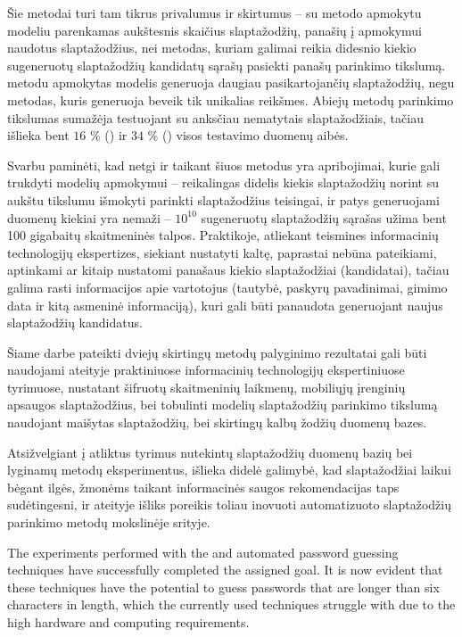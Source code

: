 \documentclass{VUMIFInfBakalaurinis}
\begin{document}
Šie metodai turi tam tikrus privalumus ir skirtumus -- su  
metodo apmokytu modeliu parenkamas aukštesnis skaičius slaptažodžių, panašių į 
apmokymui naudotus slaptažodžius, nei  metodas, kuriam 
galimai reikia didesnio kiekio sugeneruotų slaptažodžių kandidatų sąrašų 
pasiekti panašų parinkimo tikslumą.  metodu apmokytas modelis 
generuoja daugiau pasikartojančių slaptažodžių, negu  metodas, 
kuris generuoja beveik tik unikalias reikšmes. Abiejų metodų parinkimo tikslumas 
sumažėja testuojant su anksčiau nematytais slaptažodžiais, tačiau išlieka bent 
$16$ \% () ir $34$ \% () visos testavimo 
duomenų aibės.

Svarbu paminėti, kad netgi ir taikant šiuos metodus yra apribojimai, kurie gali 
trukdyti modelių apmokymui -- reikalingas didelis kiekis slaptažodžių norint su 
aukštu tikslumu išmokyti parinkti slaptažodžius teisingai, ir patys generuojami 
duomenų kiekiai yra nemaži -- $10^{10}$ sugeneruotų slaptažodžių sąrašas užima 
bent 100 gigabaitų skaitmeninės talpos. Praktikoje, atliekant teismines 
informacinių technologijų ekspertizes, siekiant nustatyti kaltę, paprastai 
nebūna pateikiami, aptinkami ar kitaip nustatomi panašaus kiekio slaptažodžiai 
(kandidatai), tačiau galima rasti informacijos apie vartotojus (tautybė, paskyrų 
pavadinimai, gimimo data ir kitą asmeninė informaciją), kuri gali būti panaudota 
generuojant naujus slaptažodžių kandidatus.

Šiame darbe pateikti dviejų skirtingų metodų palyginimo rezultatai gali būti 
naudojami ateityje praktiniuose informacinių technologijų ekspertiniuose 
tyrimuose, nustatant šifruotų skaitmeninių laikmenų, mobiliųjų įrenginių 
apsaugos slaptažodžius, bei tobulinti modelių slaptažodžių parinkimo tikslumą 
naudojant maišytas slaptažodžių, bei skirtingų kalbų žodžių duomenų bazes. 

Atsižvelgiant į atliktus tyrimus nutekintų slaptažodžių duomenų bazių bei 
lyginamų metodų eksperimentus, išlieka didelė galimybė, kad slaptažodžiai laikui 
bėgant ilgės, žmonėms taikant informacinės saugos rekomendacijas taps 
sudėtingesni, ir ateityje išliks poreikis toliau inovuoti automatizuoto 
slaptažodžių parinkimo metodų mokslinėje srityje.

The experiments performed with the  and  
automated password guessing techniques have successfully completed the assigned 
goal. It is now evident that these techniques have the potential to guess 
passwords that are longer than six characters in length, which the currently 
used techniques struggle with due to the high hardware and computing 
requirements.
\end{document}
